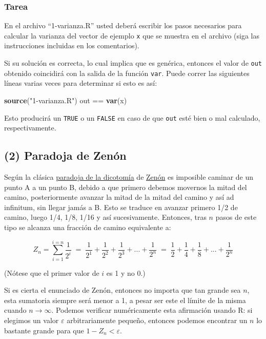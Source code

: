 \documentclass[]{article}
\newenvironment{Shaded}{}{}
\newcommand{\KeywordTok}[1]{\textcolor[rgb]{0.00,0.44,0.13}{\textbf{{#1}}}}
\newcommand{\StringTok}[1]{\textcolor[rgb]{0.25,0.44,0.63}{{#1}}}
\newcommand{\NormalTok}[1]{{#1}}
\begin{document}
\subsubsection{Tarea}

En el archivo ``1-varianza.R'' usted deberá escribir los pasos
necesarios para calcular la varianza del vector de ejemplo \texttt{x}
que se muestra en el archivo (siga las instrucciones incluidas en los
comentarios).

Si su solución es correcta, lo cual implica que es genérica, entonces el
valor de \texttt{out} obtenido coincidirá con la salida de la función
\texttt{var}. Puede correr las siguientes líneas varias veces para
determinar si esto es así:

\begin{Shaded}
\begin{Highlighting}[]
\KeywordTok{source}\NormalTok{(}\StringTok{"1-varianza.R"}\NormalTok{)}
\NormalTok{out == }\KeywordTok{var}\NormalTok{(x)}
\end{Highlighting}
\end{Shaded}
Esto producirá un \texttt{TRUE} o un \texttt{FALSE} en caso de que
\texttt{out} esté bien o mal calculado, respectivamente.

\subsection{(2) Paradoja de Zenón}

Según la clásica
\href{https://es.wikipedia.org/wiki/Paradojas\_de\_Zen\%C3\%B3n\#La\_dicotom.C3.ADa}{paradoja
de la dicotomía} de \href{http://xkcd.com/1153/}{Zenón} es imposible
caminar de un punto A a un punto B, debido a que primero debemos
movernos la mitad del camino, posteriormente avanzar la mitad de la
mitad del camino y así ad infinitum, sin llegar jamás a B. Esto se
traduce en avanzar primero 1/2 de camino, luego 1/4, 1/8, 1/16 y así
sucesivamente. Entonces, tras $n$ pasos de este tipo se alcanza una
fracción de camino equivalente a:

\[
  Z_n = \sum_{i=1}^{i=n} \frac{1}{2 ^ i} \;=\;
  \frac{1}{2 ^ 1} + \frac{1}{2 ^ 2} + \frac{1}{2 ^ 3} + ... + \frac{1}{2 ^ n} \;=\;
  \frac{1}{2} + \frac{1}{4} + \frac{1}{8} + ... + \frac{1}{2 ^ n}
\]

(Nótese que el primer valor de $i$ es 1 y no 0.)

Si es cierta el enunciado de Zenón, entonces no importa que tan grande
sea $n$, esta sumatoria siempre será menor a 1, a pesar ser este el
límite de la misma cuando $n \to \infty$. Podemos verificar
numéricamente esta afirmación usando R: si elegimos un valor
$\varepsilon$ arbitrariamente pequeño, entonces podemos encontrar un $n$
lo bastante grande para que $1 - Z_n < \varepsilon$.
\end{document}
